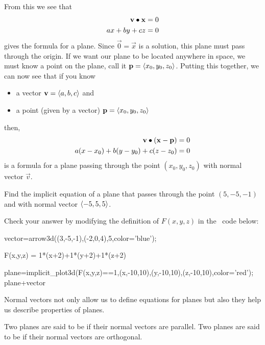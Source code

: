 \documentclass{ximera}
\begin{document}
From this we see that
\begin{align*}
  \mathbf{v}\bullet\mathbf{x} &=0\\
  ax+by+cz &= 0
\end{align*}
gives the formula for a plane. Since $\vec{0} = \vec{x}$ is a
solution, this plane must pass through the origin. If we want our
plane to be located anywhere in space, we must know a point on the
plane, call it $\mathbf{p}=\left\langle x_0,y_0,z_0\right\rangle$. Putting this together, we can
now see that if you know
\begin{itemize}
  \item a vector $\mathbf{v} = \left\langle a,b,c\right\rangle$ and
  \item a point (given by a vector) $\mathbf{p} = \left\langle x_0,y_0,z_0\right\rangle$
\end{itemize}
then,
\begin{align*}
  \mathbf{v}\bullet(\mathbf{x}-\mathbf{p}) &= 0\\
  a(x-x_0) + b(y-y_0) + c(z-z_0) &= 0
\end{align*}
is a formula for a plane passing through the point $(x_0,y_0,z_0)$
with normal vector $\vec{v}$.

\begin{question}
  Find the implicit equation of a plane that passes through the point
  $(5,-5,-1)$ and with normal vector $\left\langle -5,5,5\right\rangle$.
  \begin{onlineOnly}
    Check your answer by modifying the definition of $F(x,y,z)$ in
    the \sage\ code below:
  \begin{sageCell}
vector=arrow3d((3,-5,-1),(-2,0,4),5,color='blue');

F(x,y,z) = 1*(x+2)+1*(y+2)+1*(z+2)

plane=implicit_plot3d(F(x,y,z)==1,(x,-10,10),(y,-10,10),(z,-10,10),color='red');
plane+vector
  \end{sageCell}
  \end{onlineOnly}
\end{question}

Normal vectors not only allow us to define equations for planes but also 
they help us describe properties of planes.

\begin{definition}
  Two planes are said to be  if their normal vectors are
  parallel. Two planes are said to be  if their normal
  vectors are orthogonal.
\end{definition}
\end{document}
